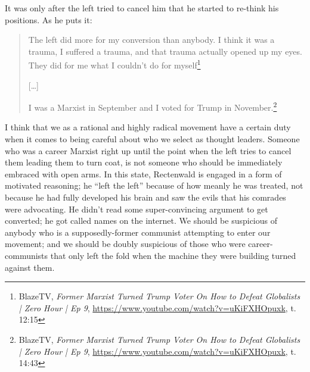 \documentclass[11pt]{article}
\begin{document}
It was only after the left tried to cancel him that he started to re-think his positions. As he puts it:
\begin{quote}
The left did more for my conversion than anybody. I think it was a trauma, I suffered a trauma, and that trauma actually opened up my eyes. They did for me what I couldn't do for myself\footnote{BlazeTV, \emph{Former Marxist Turned Trump Voter On How to Defeat Globalists | Zero Hour | Ep 9}, \url{https://www.youtube.com/watch?v=uKiFXHOpuxk}, t. 12:15}

{[}\ldots{}]

I was a Marxist in September and I voted for Trump in November.\footnote{BlazeTV, \emph{Former Marxist Turned Trump Voter On How to Defeat Globalists | Zero Hour | Ep 9}, \url{https://www.youtube.com/watch?v=uKiFXHOpuxk}, t. 14:43}
\end{quote}

I think that we as a rational and highly radical movement have a certain duty when it comes to being careful about who we select as thought leaders. Someone who was a career Marxist right up until the point when the left tries to cancel them leading them to turn coat, is not someone who should be immediately embraced with open arms. In this state, Rectenwald is engaged in a form of motivated reasoning; he ``left the left'' because of how meanly he was treated, not because he had fully developed his brain and saw the evils that his comrades were advocating. He didn't read some super-convincing argument to get converted; he got called names on the internet. We should be suspicious of anybody who is a supposedly-former communist attempting to enter our movement; and we should be doubly suspicious of those who were career-communists that only left the fold when the machine they were building turned against them.
\end{document}
